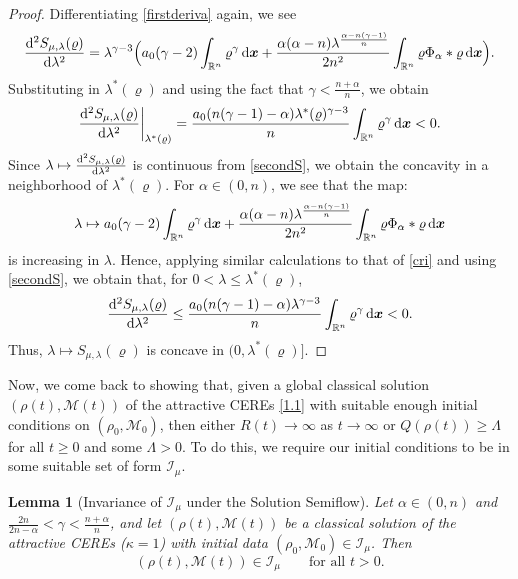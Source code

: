 \documentclass[reqno,11pt]{amsart}
\numberwithin{equation}{section}
\newtheorem{lemma}[theorem]{Lemma}
\theoremstyle{definition}
\def\d{{\rm d}}
\def\dd{{\, \rm d}}
\begin{document}
\begin{proof}
Differentiating \eqref{firstderiva} again, we see
\begin{equation}\label{secondS}
\frac{\d^2 S_{\mu,\lambda}(\varrho)}{\d \lambda^2} 
= \lambda^{\gamma - 3} 
\Big( a_0 (\gamma - 2)  \int_{\mathbb{R}^n} \varrho^\gamma \dd \boldsymbol{x} 
+ \frac{\alpha(\alpha - n) \lambda^{\frac{\alpha - n(\gamma - 1)}{n}}}{2n^2} 
\int_{\mathbb R^n}\varrho\Phi_\alpha*\varrho\dd \boldsymbol{x} \Big).
\end{equation}
Substituting in $\lambda^*(\varrho)$ and using the fact that $\gamma < \frac{n + \alpha}{n}$, we obtain
\begin{equation}\label{cri}
    \frac{\d^2 S_{\mu,\lambda}(\varrho)}{\d \lambda^2} \bigg |_{\lambda^*(\varrho)} = \frac{a_0 (n(\gamma - 1) - \alpha) \lambda^*(\varrho)^{\gamma - 3}}{n} \int_{\mathbb{R}^n} \varrho^\gamma \dd \boldsymbol{x} < 0.
\end{equation}
Since $\lambda \mapsto \frac{\d^2 S_{\mu,\lambda}(\varrho)}{\d \lambda^2}$ is continuous from \eqref{secondS}, we obtain the concavity in a neighborhood of $\lambda^*(\varrho)$. 
For $\alpha \in (0,n)$, we see that the map:
    \[
    \lambda \mapsto a_0 (\gamma - 2)  \int_{\mathbb{R}^n} \varrho^\gamma \dd \boldsymbol{x} + \frac{\alpha (\alpha - n) \lambda^{\frac{\alpha - n(\gamma - 1)}{n}}}{2n^2} \int_{\mathbb R^n}\varrho\Phi_\alpha*\varrho\dd \boldsymbol{x}
    \]
    is increasing in $\lambda$. Hence, applying similar calculations to that of \eqref{cri} and using \eqref{secondS}, we obtain that, for $0< \lambda \leq \lambda^*(\varrho)$,
    \[
  \frac{\d^2 S_{\mu,\lambda}(\varrho)}{\d \lambda^2} \leq \frac{a_0 (n(\gamma - 1) - \alpha) \lambda^{\gamma - 3}}{n} \int_{\mathbb{R}^n} \varrho^\gamma \dd \boldsymbol{x} < 0.
    \]
Thus, $\lambda \mapsto S_{\mu,\lambda}(\varrho)$ is concave in $(0,\lambda^*(\varrho)]$.
\end{proof}

Now, we come back to showing that, given a global classical solution $(\rho(t),\mathcal{M}(t))$ 
of the attractive CEREs \eqref{1.1} with suitable enough initial conditions 
on $(\rho_0,\mathcal{M}_0)$, then 
either $R(t) \to \infty$ as $t \to \infty$ or $Q(\rho(t)) \geq \Lambda$ 
for all $t \geq 0$ and some $\Lambda > 0$. 
To do this, we require our initial conditions to be in some suitable set 
of form $\mathcal{I}_\mu$.

\begin{lemma}[Invariance of $\mathcal{I}_\mu$ under the Solution Semiflow]\label{invariant}
Let $\alpha\in(0,n)$ and $\frac{2n}{2n-\alpha}<\gamma<\frac{n+\alpha}{n}$,
and let $(\rho(t),\mathcal{M}(t))$ be a classical solution of the attractive CEREs {\rm(}$\kappa=1${\rm)} with initial data $(\rho_0,\mathcal{M}_0)\in \mathcal{I}_\mu$. Then
\[
(\rho(t),\mathcal{M}(t))\in \mathcal{I}_\mu \qquad \text{for all } t>0.
\]
\end{lemma}
\end{document}
